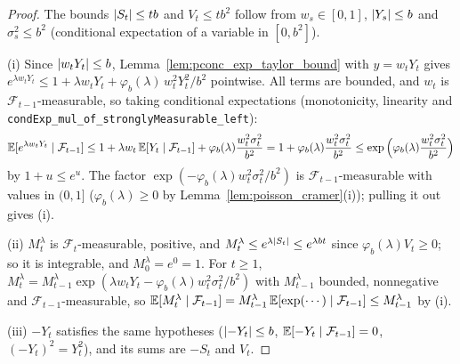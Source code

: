 \begin{proof}
\leanok
The bounds $\lvert S_t \rvert \le tb$ and $V_t \le tb^2$ follow from $w_s \in [0, 1]$, $\lvert Y_s \rvert \le b$
and $\sigma_s^2 \le b^2$ (conditional expectation of a variable in $[0, b^2]$).

(i) Since $\lvert w_t Y_t \rvert \le b$, Lemma~\ref{lem:pconc_exp_taylor_bound} with $y = w_t Y_t$ gives
$e^{\lambda w_t Y_t} \le 1 + \lambda w_t Y_t + \varphi_b(\lambda)\, w_t^2 Y_t^2/b^2$ pointwise. All terms are
bounded, and $w_t$ is $\mathcal F_{t-1}$-measurable, so taking conditional expectations
(monotonicity, linearity and \texttt{condExp\_mul\_of\_stronglyMeasurable\_left}):
\[
  \mathbb{E}[e^{\lambda w_t Y_t} \mid \mathcal F_{t-1}] \le 1 + \lambda w_t\, \mathbb{E}[Y_t \mid \mathcal F_{t-1}] + \varphi_b(\lambda) \frac{w_t^2 \sigma_t^2}{b^2}
  = 1 + \varphi_b(\lambda) \frac{w_t^2 \sigma_t^2}{b^2} \le \exp\Big(\varphi_b(\lambda) \frac{w_t^2 \sigma_t^2}{b^2}\Big)
\]
by $1 + u \le e^u$. The factor $\exp(-\varphi_b(\lambda) w_t^2 \sigma_t^2/b^2)$ is
$\mathcal F_{t-1}$-measurable with values in $(0, 1]$ ($\varphi_b(\lambda) \ge 0$ by
Lemma~\ref{lem:poisson_cramer}(i)); pulling it out gives (i).

(ii) $M^\lambda_t$ is $\mathcal F_t$-measurable, positive, and
$M^\lambda_t \le e^{\lambda \lvert S_t \rvert} \le e^{\lambda b t}$ since $\varphi_b(\lambda) V_t \ge 0$; so it is
integrable, and $M^\lambda_0 = e^0 = 1$. For $t \ge 1$,
$M^\lambda_t = M^\lambda_{t-1} \exp(\lambda w_t Y_t - \varphi_b(\lambda) w_t^2 \sigma_t^2/b^2)$ with
$M^\lambda_{t-1}$ bounded, nonnegative and $\mathcal F_{t-1}$-measurable, so
$\mathbb{E}[M^\lambda_t \mid \mathcal F_{t-1}] = M^\lambda_{t-1}\, \mathbb{E}[\exp(\cdots) \mid \mathcal F_{t-1}] \le M^\lambda_{t-1}$ by (i).

(iii) $-Y_t$ satisfies the same hypotheses ($\lvert -Y_t \rvert \le b$, $\mathbb{E}[-Y_t \mid \mathcal F_{t-1}] = 0$,
$(-Y_t)^2 = Y_t^2$), and its sums are $-S_t$ and $V_t$.
\end{proof}

